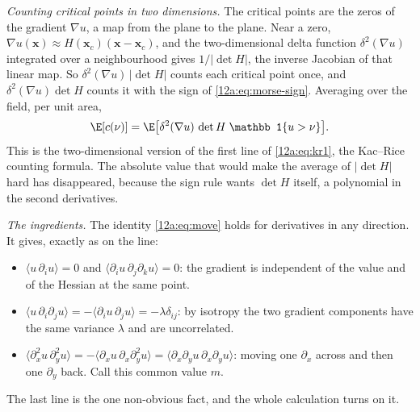 \emph{Counting critical points in two dimensions.} The critical points are the zeros of the gradient
$\nabla u$, a map from the plane to the plane. Near a zero, $\nabla u(\bm x)\approx H(\bm x_c)(\bm x-\bm x_c)$,
and the two-dimensional delta function $\delta^2(\nabla u)$ integrated over a neighbourhood gives
$1/|\det H|$, the inverse Jacobian of that linear map. So $\delta^2(\nabla u)\,|\det H|$ counts each critical
point once, and $\delta^2(\nabla u)\det H$ counts it with the sign of \eqref{12a:eq:morse-sign}. Averaging
over the field, per unit area,
\begin{equation}
  \E[c(\nu)]=\E\big[\delta^2(\nabla u)\,\det H\;\mathbb 1\{u>\nu\}\big].
  \label{12a:eq:kr2}
\end{equation}
This is the two-dimensional version of the first line of \eqref{12a:eq:kr1}, the Kac--Rice counting
formula. The absolute value that would make the average of $|\det H|$ hard has disappeared, because the sign
rule wants $\det H$ itself, a polynomial in the second derivatives.

\emph{The ingredients.} The identity \eqref{12a:eq:move} holds for derivatives in any direction. It gives,
exactly as on the line:
\begin{itemize}[itemsep=1pt,leftmargin=1.2em]
  \item $\langle u\,\partial_iu\rangle=0$ and $\langle\partial_iu\,\partial_j\partial_ku\rangle=0$: the
        gradient is independent of the value and of the Hessian at the same point.
  \item $\langle u\,\partial_i\partial_ju\rangle=-\langle\partial_iu\,\partial_ju\rangle=-\lambda\delta_{ij}$:
        by isotropy the two gradient components have the same variance $\lambda$ and are uncorrelated.
  \item $\langle\partial_x^2u\,\partial_y^2u\rangle=-\langle\partial_xu\,\partial_x\partial_y^2u\rangle
        =\langle\partial_x\partial_yu\,\partial_x\partial_yu\rangle$: moving one $\partial_x$ across and then
        one $\partial_y$ back. Call this common value $m$.
\end{itemize}
The last line is the one non-obvious fact, and the whole calculation turns on it.

